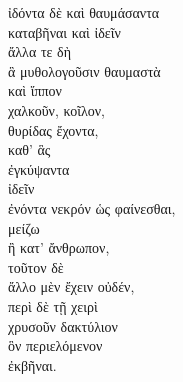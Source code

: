 {\large
\begin{greek}
\noindent ἰδόντα δὲ καὶ θαυμάσαντα\\
καταβῆναι καὶ ἰδεῖν\\
ἄλλα τε δὴ\\
\tabto{2em} ἃ μυθολογοῦσιν θαυμαστὰ\\
καὶ ἵππον\\
\tabto{2em} χαλκοῦν, κοῖλον,\\
\tabto{2em} θυρίδας ἔχοντα,\\

\tabto{4em} καθ' ἃς\\
\tabto{4em} ἐγκύψαντα\\
\tabto{4em} ἰδεῖν\\
\tabto{4em} ἐνόντα νεκρόν ὡς φαίνεσθαι,\\
\tabto{4em} μείζω\\
\tabto{6em} ἢ κατ' ἄνθρωπον,\\
\tabto{4em} τοῦτον δὲ\\
\tabto{6em} ἄλλο μὲν ἔχειν οὐδέν,\\
\tabto{6em} περὶ δὲ τῇ χειρὶ\\
\tabto{6em} χρυσοῦν δακτύλιον\\
\tabto{4em} ὃν περιελόμενον\\
\tabto{4em} ἐκβῆναι.\\

\end{greek}
}

